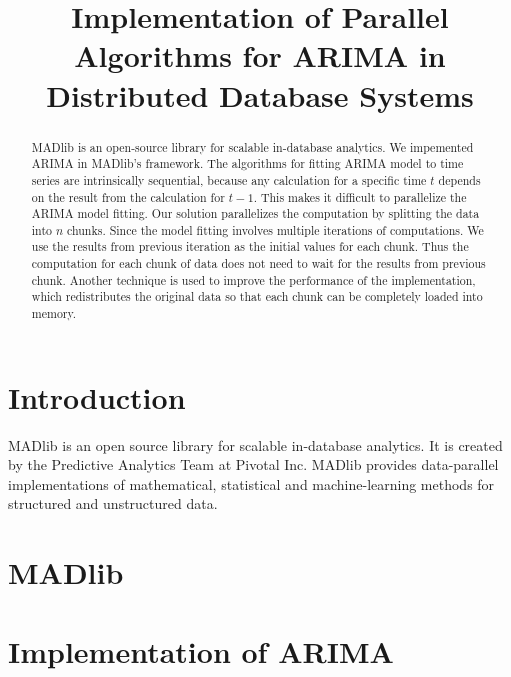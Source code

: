 \documentclass[english,12pt]{article}
\begin{document}
\title{Implementation of Parallel Algorithms for ARIMA in Distributed
  Database Systems}


\maketitle

\begin{abstract} MADlib is an open-source library for scalable in-database
  analytics. We impemented ARIMA in MADlib's framework. The algorithms for
  fitting ARIMA model to time series are intrinsically sequential, because any
  calculation for a specific time $t$ depends on the result from the
  calculation for $t-1$.  This makes it difficult to parallelize the ARIMA
  model fitting. Our solution parallelizes the computation by splitting the
  data into $n$ chunks. Since the model fitting involves multiple iterations of
  computations. We use the results from previous iteration as the initial
  values for each chunk. Thus the computation for each chunk of data does not
  need to wait for the results from previous chunk. Another technique is used
  to improve the performance of the implementation, which redistributes the
  original data so that each chunk can be completely loaded into memory.
  \end{abstract}

\section{Introduction}

MADlib is an open source library for scalable in-database analytics. It is
created by the Predictive Analytics Team at Pivotal Inc. MADlib provides
data-parallel implementations of mathematical, statistical and machine-learning
methods for structured and unstructured data. 

\section{MADlib}


\section{Implementation of ARIMA}

\end{document}
